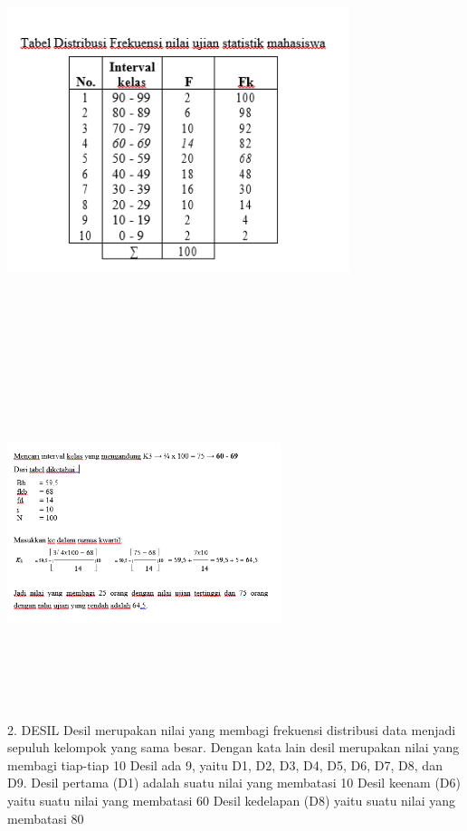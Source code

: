\documentclass[11pt,fleqn]{book} %
\begin{document}
{\includegraphics[width = 10cm, height= 12cm]{Pictures/rizkie2.png}

\includegraphics[width = 8cm, height= 10cm]{Pictures/rizkie3.png}

2. DESIL
Desil merupakan nilai yang membagi frekuensi distribusi data menjadi sepuluh kelompok yang sama besar. Dengan kata lain desil merupakan nilai yang membagi tiap-tiap 10%
Desil ada 9, yaitu D1, D2, D3, D4, D5, D6, D7, D8, dan D9.
Desil pertama (D1) adalah suatu nilai yang membatasi 10%
Desil keenam (D6) yaitu suatu nilai yang membatasi 60%
Desil kedelapan (D8) yaitu suatu nilai yang membatasi 80%

}
\end{document}

